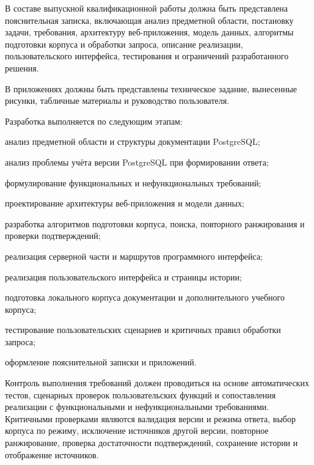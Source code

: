 
В составе выпускной квалификационной работы должна быть представлена пояснительная записка, включающая анализ предметной области, постановку задачи, требования, архитектуру веб-приложения, модель данных, алгоритмы подготовки корпуса и обработки запроса, описание реализации, пользовательского интерфейса, тестирования и ограничений разработанного решения.

В приложениях должны быть представлены техническое задание, вынесенные рисунки, табличные материалы и руководство пользователя.


Разработка выполняется по следующим этапам:

\begin{compactlist}
  \item анализ предметной области и структуры документации PostgreSQL;
  \item анализ проблемы учёта версии PostgreSQL при формировании ответа;
  \item формулирование функциональных и нефункциональных требований;
  \item проектирование архитектуры веб-приложения и модели данных;
  \item разработка алгоритмов подготовки корпуса, поиска, повторного ранжирования и проверки подтверждений;
  \item реализация серверной части и маршрутов программного интерфейса;
  \item реализация пользовательского интерфейса и страницы истории;
  \item подготовка локального корпуса документации и дополнительного учебного корпуса;
  \item тестирование пользовательских сценариев и критичных правил обработки запроса;
  \item оформление пояснительной записки и приложений.
\end{compactlist}


Контроль выполнения требований должен проводиться на основе автоматических тестов, сценарных проверок пользовательских функций и сопоставления реализации с функциональными и нефункциональными требованиями. Критичными проверками являются валидация версии и режима ответа, выбор корпуса по режиму, исключение источников другой версии, повторное ранжирование, проверка достаточности подтверждений, сохранение истории и отображение источников.

